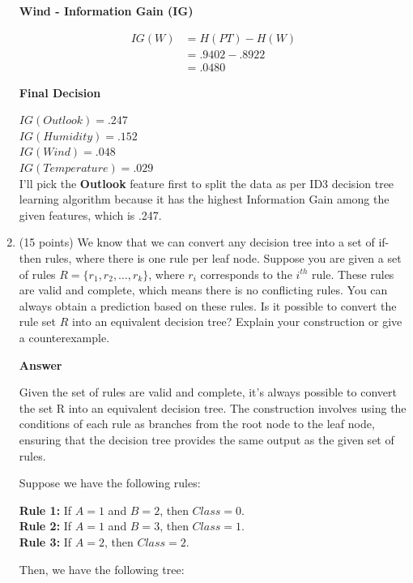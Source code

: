 \documentclass[11pt]{article}
\begin{document}
\begin{enumerate}
\textbf{Wind - Information Gain (IG)}

\[
\begin{aligned}
IG(W)&= H(PT) - H(W)\\[5pt]
&= .9402 - .8922\\[5pt]
&= .0480
\end{aligned}
\]

\textbf{Final Decision}

$IG(Outlook) = .247$\\
$IG(Humidity) = .152$\\
$IG(Wind) = .048$\\
$IG(Temperature) = .029$\\

I'll pick the \textbf{Outlook} feature first to split the data as per ID3 decision tree learning algorithm because it has the highest Information Gain among the given features, which is .247.

\item (15 points) We know that we can convert any decision tree
into a set of if-then rules, where there is one rule per leaf
node. Suppose you are given a set of rules $R = \{r_1, r_2,
\dots, r_k\}$, where $r_i$ corresponds to the $i^{th}$ rule.
{\color{red} These rules are valid and complete, which means
there is no conflicting rules. You can always obtain a prediction
based on these rules.} Is it possible to convert the rule set $R$
into an equivalent decision tree? Explain your construction or
give a counterexample.

\textbf{Answer}

Given the set of rules are valid and complete, it's always possible to convert the set R into an equivalent decision tree. The construction involves using the conditions of each rule as branches from the root node to the leaf node, ensuring that the decision tree provides the same output as the given set of rules.

Suppose we have the following rules:

\textbf{Rule 1:} If $A=1$ and $B=2$, then $Class=0$.\\
\textbf{Rule 2:} If $A=1$ and $B=3$, then $Class=1$.\\
\textbf{Rule 3:} If $A=2$, then $Class=2$.

Then, we have the following tree:

\begin{figure}[ht]
    \centering
    \begin{tikzpicture}[
        level distance=2cm,
        sibling distance=5cm,
        edge from parent/.style={draw, -{Latex}, thick}
    ]


\end{tikzpicture}
\end{figure}
\end{enumerate}
\end{document}
